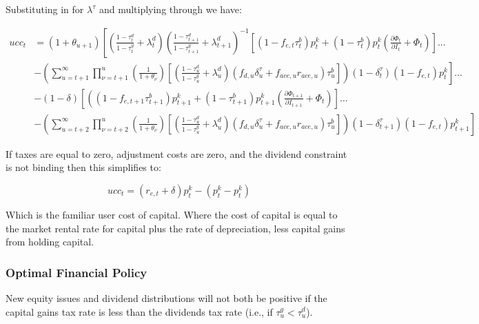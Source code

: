 Substituting in for $\lambda^{\tau}$ and multiplying through we have:

\begin{equation}
\begin{split}
ucc_{t} &=  \left({1+\theta_{u+1}}\right)\left[\left(\frac{1-\tau^{d}_{t}}{1-\tau^{g}_{t}} + \lambda^{d}_{t}\right) \left(\frac{1-\tau^{d}_{t+1}}{1-\tau^{g}_{t+1}} + \lambda^{d}_{t+1} \right)^{-1}\left[(1-f_{e,t}\tau^{b}_{t})p^{k}_{t}+ (1-\tau^{b}_{t})p^{k}_{t}\left(\frac{\partial \Phi_{t}}{\partial I_{t}} + \Phi_{t}\right)\right]... \right. \\
& \left. -  \left( \sum_{u=t+1}^{\infty} \prod_{\nu=t+1}^{u}\left(\frac{1}{1+\theta_{\nu}}\right)\left[\left(\frac{1-\tau^{d}_{u}}{1-\tau^{g}_{u}}+\lambda^{d}_{u}\right)\left( f_{d,u}\delta^{\tau}_{u}+f_{ace,u}r_{ace,u} \right)\tau^{b}_{u}\right]\right) (1-\delta^{\tau}_{t})(1-f_{e,t})p^{k}_{t}\right] ...   \\
& - (1-\delta)\left[ \left((1-f_{e,t+1}\tau^{b}_{t+1})p^{k}_{t+1}+ (1-\tau^{b}_{t+1})p^{k}_{t+1}\left(\frac{\partial \Phi_{t+1}}{\partial I_{t+1}} + \Phi_{t}\right)\right] ... \right. \\
& \left. - \left(  \sum_{u=t+2}^{\infty} \prod_{\nu=t+2}^{u}\left(\frac{1}{1+\theta_{\nu}}\right)\left[\left(\frac{1-\tau^{d}_{u}}{1-\tau^{g}_{u}}+\lambda^{d}_{u}\right)\left( f_{d,u}\delta^{\tau}_{u}+f_{ace,u}r_{ace,u} \right)\tau^{b}_{u}\right] \right)(1-\delta^{\tau}_{t+1})(1-f_{e,t})p^{k}_{t+1}\right]
\end{split}
\end{equation}

If taxes are equal to zero, adjustment costs are zero, and the dividend constraint is not binding then this simplifies to:

\begin{equation}
ucc_{t}= (r_{e,t}+ \delta)p^{k}_{t} - (p^{k}_{t}-p^{k}_{t})
\end{equation}

Which is the familiar user cost of capital.  Where the cost of capital is equal to the market rental rate for capital  plus the rate of depreciation, less capital gains from holding capital.


\subsubsection{Optimal Financial Policy}

\begin{proposition}
\label{prop:vn_div}
New equity issues and dividend distributions will not both be positive if the capital gains tax rate is less than the dividends tax rate (i.e., if $\tau^{g}_{u}<\tau^{d}_{u}$).
\end{proposition}

